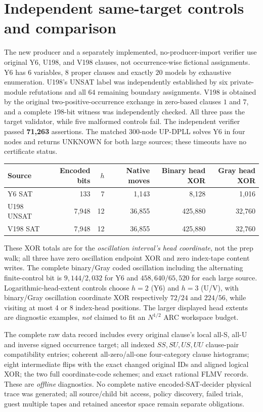 \documentclass[10pt]{article}
\begin{document}
\section*{Independent same-target controls and comparison}
The new producer and a separately implemented, no-producer-import verifier use original Y6, U198, and V198 clauses, not occurrence-wise fictional assignments. Y6 has $6$ variables, $8$ proper clauses and exactly $20$ models by exhaustive enumeration. U198's UNSAT label was independently established by six private-module refutations and all $64$ remaining boundary assignments. V198 is obtained by the original two-positive-occurrence exchange in zero-based clauses $1$ and $7$, and a complete $198$-bit witness was independently checked. All three pass the target validator, while five malformed controls fail. The independent verifier passed \textbf{71,263} assertions. The matched 300-node UP-DPLL solves Y6 in four nodes and returns UNKNOWN for both large sources; these timeouts have no certificate status.

\begin{center}\small
\begin{tabular}{lrrrrr}
\toprule
Source & Encoded bits & $h$ & Native moves & Binary head XOR & Gray head XOR\\
\midrule
Y6 SAT & 133 & 7 & 1,143 & 8,128 & 1,016\\
U198 UNSAT & 7,948 & 12 & 36,855 & 425,880 & 32,760\\
V198 SAT & 7,948 & 12 & 36,855 & 425,880 & 32,760\\
\bottomrule
\end{tabular}
\end{center}
\noindent These XOR totals are for the \emph{oscillation interval's head coordinate}, not the prep walk; all three have zero oscillation endpoint XOR and zero index-tape content writes. The complete binary/Gray coded oscillation including the alternating finite-control bit is $9,144/2,032$ for Y6 and $458,640/65,520$ for each large source. Logarithmic-head-extent controls choose $h=2$ (Y6) and $h=3$ (U/V), with binary/Gray oscillation coordinate XOR respectively $72/24$ and $224/56$, while visiting at most 4 or 8 index-head positions. The larger displayed head extents are diagnostic examples, \emph{not} claimed to fit an $N^{1/2}$ ARC workspace budget.

The complete raw data record includes every original clause's local all-S, all-U and inverse signed occurrence target; all indexed $SS,SU,US,UU$ clause-pair compatibility entries; coherent all-zero/all-one four-category clause histograms; eight intermediate flips with the exact changed original IDs and aligned logical XOR; the two full coordinate-code schemes; and exact rational FLMV records. These are \emph{offline} diagnostics. No complete native encoded-SAT-decider physical trace was generated; all source/child bit access, policy discovery, failed trials, guest multiple tapes and retained ancestor space remain separate obligations.
\end{document}
